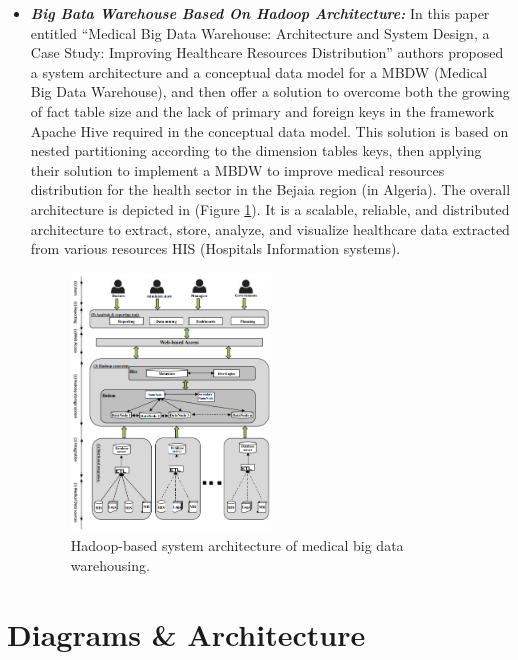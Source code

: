 \begin{itemize}
    \item \textbf{\textit{Big Bata Warehouse Based On Hadoop Architecture:}} In this paper\cite{sebaa2018medical} entitled “Medical Big Data Warehouse: Architecture and System Design, a Case Study: Improving Healthcare Resources Distribution” authors proposed a system architecture and a conceptual data model for a MBDW (Medical Big Data Warehouse), and then offer a solution to overcome both the growing of fact table size and the lack of primary and foreign keys in the framework Apache Hive required in the conceptual data model. This solution is based on nested partitioning according to the dimension tables keys, then  applying their solution to implement a MBDW to improve medical resources distribution for the health sector in the Bejaia region (in Algeria). 
    \newpage
    The overall architecture is depicted in (Figure \ref{fig:bigdatarelated}). It is a scalable, reliable, and distributed architecture to extract, store, analyze, and visualize healthcare data extracted from various resources HIS (Hospitals Information systems).
    \begin{figure}[h!]
      \center
      \includegraphics[width=0.50\textwidth]{images/chapter2/relatedworkHadoop.PNG}
      \caption{Hadoop-based system
      architecture of medical big data warehousing.}
      \label{fig:bigdatarelated}
    \end{figure}
\end{itemize}



\section{Diagrams \& Architecture}
